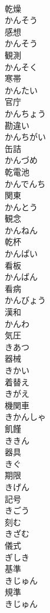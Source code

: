 \documentclass[8pt]{extreport}
\begin{document}
\begin{CJK}{UTF8}{min}
\\	乾燥 
\\	かんそう	
\\	感想 
\\	かんそう	
\\	観測 
\\	かんそく	
\\	寒帯 
\\	かんたい	
\\	官庁 
\\	かんちょう	
\\	勘違い 
\\	かんちがい	
\\	缶詰 
\\	かんづめ	
\\	乾電池 
\\	かんでんち	
\\	関東 
\\	かんとう	
\\	観念 
\\	かんねん	
\\	乾杯 
\\	かんぱい	
\\	看板 
\\	かんばん	
\\	看病 
\\	かんびょう	
\\	漢和 
\\	かんわ	
\\	気圧 
\\	きあつ	
\\	器械 
\\	きかい	
\\	着替え 
\\	きがえ	
\\	機関車 
\\	きかんしゃ	
\\	飢饉 
\\	ききん	
\\	器具 
\\	きぐ	
\\	期限 
\\	きげん	
\\	記号 
\\	きごう	
\\	刻む 
\\	きざむ	
\\	儀式 
\\	ぎしき	
\\	基準 
\\	きじゅん	
\\	規準 
\\	きじゅん	

\end{CJK}
\end{document}
